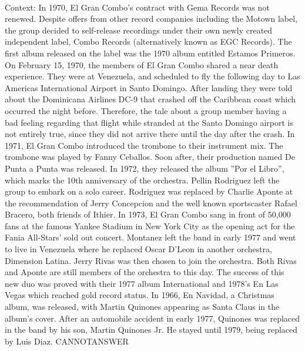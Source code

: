\documentclass[11pt,a4paper, onecolumn]{article}
\begin{document}
\\ Context: In 1970, El Gran Combo's contract with Gema Records was not renewed. Despite offers from other record companies including the Motown label, the group decided to self-release recordings under their own newly created independent label, Combo Records (alternatively known as EGC Records). The first album released on the label was the 1970 album entitled Estamos Primeros. On February 15, 1970, the members of El Gran Combo shared a near death experience. They were at Venezuela, and scheduled to fly the following day to Las Americas International Airport in Santo Domingo. After landing they were told about the Dominicana Airlines DC-9 that crashed off the Caribbean coast which occurred the night before. Therefore, the tale about a group member having a bad feeling regarding that flight while stranded at the Santo Domingo airport is not entirely true, since they did not arrive there until the day after the crash. In 1971, El Gran Combo introduced the trombone to their instrument mix. The trombone was played by Fanny Ceballos. Soon after, their production named De Punta a Punta was released. In 1972, they released the album ''Por el Libro'', which marks the 10th anniversary of the orchestra. Pellin Rodriguez left the group to embark on a solo career. Rodriguez was replaced by Charlie Aponte at the recommendation of Jerry Concepcion and the well known sportscaster Rafael Bracero, both friends of Ithier. In 1973, El Gran Combo sang in front of 50,000 fans at the famous Yankee Stadium in New York City as the opening act for the Fania All-Stars' sold out concert. Montanez left the band in early 1977 and went to live in Venezuela where he replaced Oscar D'Leon in another orchestra, Dimension Latina. Jerry Rivas was then chosen to join the orchestra. Both Rivas and Aponte are still members of the orchestra to this day. The success of this new duo was proved with their 1977 album International and 1978's En Las Vegas which reached gold record status. In 1966, En Navidad, a Christmas album, was released, with Martin Quinones appearing as Santa Claus in the album's cover. After an automobile accident in early 1977, Quinones was replaced in the band by his son, Martin Quinones Jr. He stayed until 1979, being replaced by Luis Diaz. CANNOTANSWER
\end{document}
